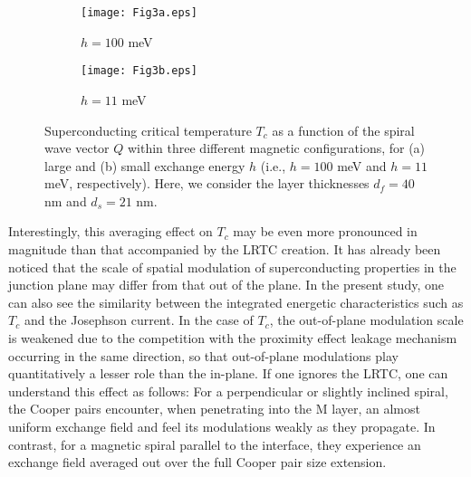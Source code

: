\documentclass[prb,amsmath,amssymb,reprint]{revtex4-2}
\begin{document}


\begin{figure*}[htb]
\begin{subfigure}{.5\textwidth}
  \texttt{[image: Fig3a.eps]}
  \caption{$h=100$ meV}
  \label{Fig3a}
\end{subfigure}%
\begin{subfigure}{.5\textwidth}
  \texttt{[image: Fig3b.eps]}
  \caption{$h=11$ meV}
  \label{Fig3b}
\end{subfigure}
\caption{
Superconducting critical temperature $T_c$ as a function of the spiral wave vector $Q$ within three different magnetic configurations, for (a) large and (b) small exchange energy $h$ (i.e., $h=100$ meV and $h=11$ meV, respectively). Here, we consider the layer thicknesses $d_f=40$ nm and $d_s=21$ nm. \vspace*{0.5cm}
}
\label{Fig3}
\end{figure*}



Interestingly, this averaging effect on $T_c$ may be even more pronounced in magnitude than that accompanied by the LRTC creation. It has already been noticed \cite{PugachPRB2009} that the scale of spatial modulation of superconducting properties in the junction plane may differ from that out of the plane. In the present study, one can also see the similarity between
the integrated energetic characteristics such as  $T_c$ and the Josephson current.
In the case of $T_c$,
the out-of-plane modulation scale is weakened due to the competition with the proximity effect leakage mechanism occurring in the same direction, so that out-of-plane modulations play quantitatively a lesser  role than the in-plane.
If one ignores the LRTC, one can understand this effect as follows: For a perpendicular or slightly inclined spiral, the Cooper pairs encounter, when penetrating into the M layer, an almost uniform exchange field and feel its modulations weakly as they propagate. In contrast, for a magnetic spiral parallel to the interface, they experience an exchange field averaged out over the full Cooper pair size extension.
\end{document}
